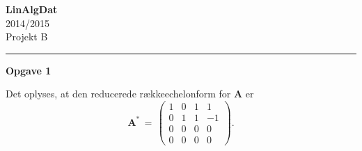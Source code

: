 \documentclass[12pt,a4paper]{article}
\begin{document}
\begin{minipage}[b]{1.0\linewidth} 


\vspace*{-16ex}
\begin{center}
    {\Large \bf LinAlgDat} \vspace*{1ex} \\
    {\large 2014/2015} \vspace*{1ex} \\
    {\large Projekt B}
\end{center}

\vspace*{-3pt}
\hrule
\end{minipage}
\vspace{5ex}

\newpage


{\bf Opgave 1 \ }

Det oplyses, at den reducerede rækkeechelonform for $\mathbf{A}$ er 
\begin{displaymath}
  \mathbf{A}^* \,=\,
    \left(\!\!
    \begin{array}{rrrr}
      1 & 0 & 1 &  1 \\
      0 & 1 & 1 & -1 \\  
      0 & 0 & 0 &  0 \\
      0 & 0 & 0 &  0  
    \end{array}
    \!\!\right).
\end{displaymath}
\end{document}
